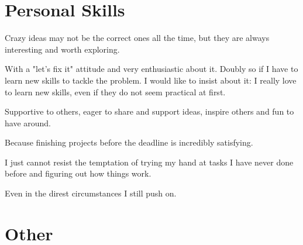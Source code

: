 \documentclass[11pt,a4paper,roman]{moderncv}
\begin{document}


\section{Personal Skills}

{Crazy ideas may not be the correct ones all the time, but they are always interesting and worth exploring.}

{With a "let's fix it" attitude and very enthusiastic about it. Doubly so if I have to learn new skills to tackle the problem. I would like to insist about it: I really love to learn new skills, even if they do not seem practical at first.}

{Supportive to others, eager to share and support ideas, inspire others and fun to have around.}

{Because finishing projects before the deadline is incredibly satisfying.}

{I just cannot resist the temptation of trying my hand at tasks I have never done before and figuring out how things work.}

{Even in the direst circumstances I still push on.}

\section{Other}



\renewcommand{\listitemsymbol}{-~}            %


\end{document}
